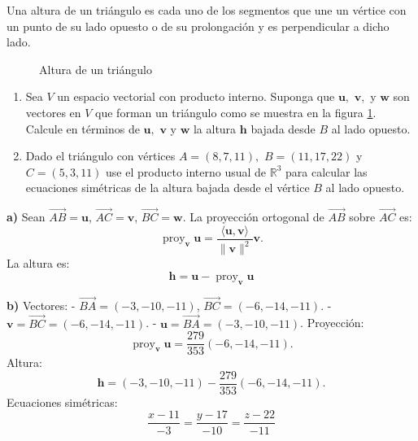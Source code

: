 \begin{prob}
Una altura de un triángulo es cada uno de los segmentos que une un vértice con un punto de su lado opuesto o de su prolongación y es perpendicular a dicho lado.
\begin{figure}[H]
\centering
{}
\caption{Altura de un triángulo}\label{fig1}
\end{figure}
\begin{enumerate}
\item Sea $V$ un espacio vectorial con producto interno. Suponga que $\mathbf{u},$ $\mathbf{v},$ y $\mathbf{w}$ son vectores en $V$ que forman un triángulo como se muestra en la figura \ref{fig1}. Calcule en términos de $\mathbf{u},$ $\mathbf{v}$ y $\mathbf{w}$ la altura $\mathbf{h}$ bajada desde $B$ al lado opuesto.
\item Dado el triángulo con vértices $A=(8,7,11),$ $B=(11,17,22)$ y $C=(5,3,11)$ use el producto interno usual de $\mathbb{R}^3$ para calcular las ecuaciones simétricas de la altura bajada desde el vértice $B$ al lado opuesto.
\end{enumerate}
\begin{myproof}
\textbf{a)} Sean \( \overrightarrow{AB} = \mathbf{u} \), \( \overrightarrow{AC} = \mathbf{v} \), \( \overrightarrow{BC} = \mathbf{w} \). La proyección ortogonal de \( \overrightarrow{AB} \) sobre \( \overrightarrow{AC} \) es:
\[
\operatorname{proy}_{\mathbf{v}} \mathbf{u} = \frac{\langle \mathbf{u}, \mathbf{v} \rangle}{\|\mathbf{v}\|^2} \mathbf{v}.
\]
La altura es:
\[
\boxed{\mathbf{h} = \mathbf{u} - \operatorname{proy}_{\mathbf{v}} \mathbf{u}}
\]

\textbf{b)} Vectores:
- \( \overrightarrow{BA} = (-3, -10, -11) \), \( \overrightarrow{BC} = (-6, -14, -11) \).
- \( \mathbf{v} = \overrightarrow{BC} = (-6, -14, -11) \).
- \( \mathbf{u} = \overrightarrow{BA} = (-3, -10, -11) \).
Proyección:
\[
\operatorname{proy}_{\mathbf{v}} \mathbf{u} = \frac{279}{353} (-6, -14, -11).
\]
Altura:
\[
\mathbf{h} = (-3, -10, -11) - \frac{279}{353} (-6, -14, -11).
\]
Ecuaciones simétricas:
\[
\boxed{\frac{x - 11}{-3} = \frac{y - 17}{-10} = \frac{z - 22}{-11}}
\]
\end{myproof}
\end{prob}

